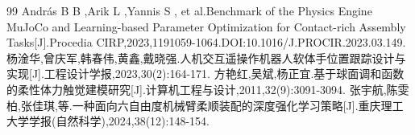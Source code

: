 \begin{thebibliography}{99}
 András B B ,Arik L ,Yannis S , et al.Benchmark of the Physics Engine MuJoCo and Learning-based Parameter Optimization for Contact-rich Assembly Tasks[J].Procedia CIRP,2023,1191059-1064.DOI:10.1016/J.PROCIR.2023.03.149.
 杨淦华,曾庆军,韩春伟,黄鑫,戴晓强.人机交互遥操作机器人软体手位置跟踪设计与实现[J].工程设计学报,2023,30(2):164-171.
 方艳红,吴斌,杨正宜.基于球面调和函数的柔性体力触觉建模研究[J].计算机工程与设计,2011,32(9):3091-3094.
 张宇航,陈雯柏,张佳琪,等.一种面向六自由度机械臂柔顺装配的深度强化学习策略[J].重庆理工大学学报(自然科学),2024,38(12):148-154.
\end{thebibliography}
